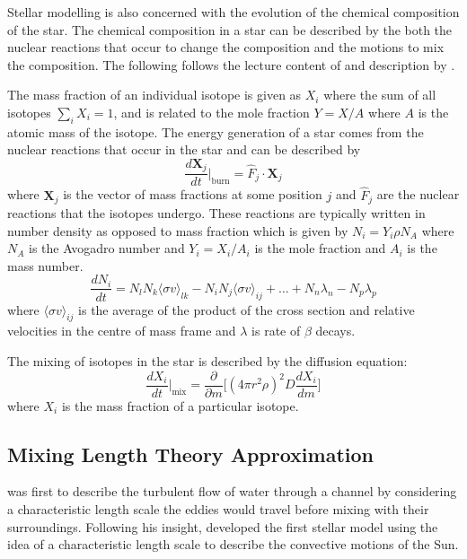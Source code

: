 Stellar modelling is also concerned with the evolution of the chemical composition of the star.
The chemical composition in a star can be described by the both the nuclear reactions that occur to change the composition and the motions to mix the composition.
The following follows the lecture content of \cite{herwigASTR5012023} and description by \cite{langerEvolutionMassiveStars1985}.

The mass fraction of an individual isotope is given as $X_i$ where the sum of all isotopes $\sum_i X_i = 1$, and is related to the mole fraction $Y=X/A$ where $A$ is the atomic mass of the isotope.
The energy generation of a star comes from the nuclear reactions that occur in the star and can be described by
\begin{equation}\label{eq:dX_dt_burn}
    \frac{d\mathbf{X}_j}{dt}\Bigg|_{\mathrm{burn}} = \hat{F}_j \cdot \mathbf{X}_j
\end{equation}
where $\mathbf{X}_j$ is the vector of mass fractions at some position $j$ and $\hat{F}_j$ are the nuclear reactions that the isotopes undergo.
These reactions are typically written in number density as opposed to mass fraction
which is given by $N_i = Y_i \rho N_A$ where $N_A$ is the Avogadro number and $Y_i = X_i / A_i$ is the mole fraction and $A_i$ is the mass number.
\begin{equation}
    \frac{dN_i}{dt} = N_l N_k \langle\sigma v\rangle_{lk} - N_i N_j \langle\sigma v\rangle_{ij} + \ldots + N_n \lambda_{n} - N_p \lambda_{p}
\end{equation}
where $\langle \sigma v \rangle_{ij}$ is the average of the product of the cross section and relative velocities in the centre of mass frame and $\lambda$ is rate of $\beta$ decays.

The mixing of isotopes in the star is described by the diffusion equation:
\begin{equation}\label{eq:dX_dm}
    \frac{d X_i}{dt}\Bigg|_{\mathrm{mix}} = \frac{\partial}{\partial m}\Biggl[(4 \pi r^2 \rho)^2 D \frac{d X_i}{dm} \Biggr]
\end{equation}
where $X_i$ is the mass fraction of a particular isotope.

\subsection{Mixing Length Theory Approximation}

\cite{prandtl7BerichtUber1925} was first to describe the turbulent flow of water through a channel by considering a characteristic length scale the eddies would travel before mixing with their surroundings.
Following his insight, \cite{bohm-vitenseUberWasserstoffkonvektionszoneSternen1958} developed the first stellar model using the idea of a characteristic length scale to describe the convective motions of the Sun.

